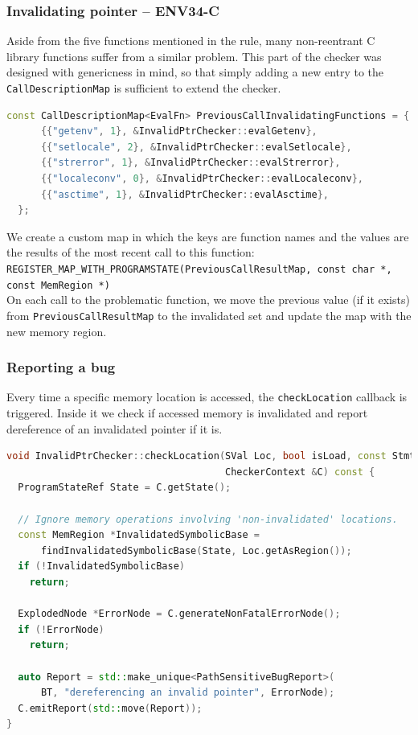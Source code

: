 \subsubsection{Invalidating pointer -- ENV34-C}

Aside from the five functions mentioned in the rule, many non-reentrant C library functions suffer from a similar problem.
This part of the checker was designed with genericness in mind, so that simply adding a new entry to the \lstinline{CallDescriptionMap} is sufficient to extend the checker. 


\begin{lstlisting}[language={C++}]
  const CallDescriptionMap<EvalFn> PreviousCallInvalidatingFunctions = {
      {{"getenv", 1}, &InvalidPtrChecker::evalGetenv},
      {{"setlocale", 2}, &InvalidPtrChecker::evalSetlocale},
      {{"strerror", 1}, &InvalidPtrChecker::evalStrerror},
      {{"localeconv", 0}, &InvalidPtrChecker::evalLocaleconv},
      {{"asctime", 1}, &InvalidPtrChecker::evalAsctime},
  };
\end{lstlisting}

We create a custom map in which the keys are function names and the values are the results of the most recent call to this function: \\
\lstinline{REGISTER_MAP_WITH_PROGRAMSTATE(PreviousCallResultMap, const char *, const MemRegion *)} \\

On each call to the problematic function, we move the previous value (if it exists) from \lstinline{PreviousCallResultMap} to the invalidated set and update the map with the new memory region. 

\subsubsection{Reporting a bug}

Every time a specific memory location is accessed, the \lstinline{checkLocation} callback is triggered. Inside it we check if accessed memory is invalidated and report dereference of an invalidated pointer if it is. \\



\begin{lstlisting}[language={C++}]
  void InvalidPtrChecker::checkLocation(SVal Loc, bool isLoad, const Stmt *S,
                                      CheckerContext &C) const {
  ProgramStateRef State = C.getState();

  // Ignore memory operations involving 'non-invalidated' locations.
  const MemRegion *InvalidatedSymbolicBase =
      findInvalidatedSymbolicBase(State, Loc.getAsRegion());
  if (!InvalidatedSymbolicBase)
    return;

  ExplodedNode *ErrorNode = C.generateNonFatalErrorNode();
  if (!ErrorNode)
    return;

  auto Report = std::make_unique<PathSensitiveBugReport>(
      BT, "dereferencing an invalid pointer", ErrorNode);
  C.emitReport(std::move(Report));
}
\end{lstlisting}

